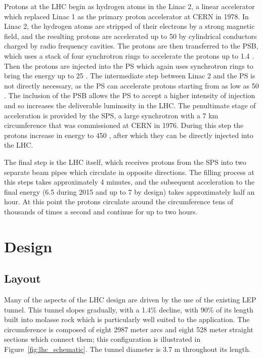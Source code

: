 Protons at the \ac{LHC} begin as hydrogen atoms in the Linac 2, a linear accelerator which replaced Linac 1 as the primary proton accelerator at CERN in 1978.
In Linac 2, the hydrogen atoms are stripped of their electrons by a strong magnetic field, and the resulting protons are accelerated up to 50 \MeV by cylindrical conductors charged by radio frequency cavities.
The protons are then transferred to the \ac{PSB}, which uses a stack of four synchrotron rings to accelerate the protons up to 1.4 \GeV.
Then the protons are injected into the \ac{PS} which again uses synchrotron rings to bring the energy up to 25 \GeV.
The intermediate step between Linac 2 and the \ac{PS} is not directly necessary, as the \ac{PS} can accelerate protons starting from as low as 50 \MeV.
The inclusion of the \ac{PSB} allows the \ac{PS} to accept a higher intensity of injection and so increases the deliverable luminosity in the \ac{LHC}.
The penultimate stage of acceleration is provided by the \ac{SPS}, a large synchrotron with a 7 km circumference that was commissioned at CERN in 1976.
During this step the protons increase in energy to 450 \GeV, after which they can be directly injected into the \ac{LHC}. 


The final step is the \ac{LHC} itself, which receives protons from the \ac{SPS} into two separate beam pipes which circulate in opposite directions.
The filling process at this steps takes approximately 4 minutes, and the subsequent acceleration to the final energy (6.5 \TeV during 2015 and up to 7 \TeV by design) takes approximately half an hour.
At this point the protons circulate around the circumference tens of thousands of times a second and continue for up to two hours.


\section{Design}

\subsection{Layout}

Many of the aspects of the \ac{LHC} design are driven by the use of the existing \ac{LEP} tunnel. 
This tunnel slopes gradually, with a 1.4\% decline, with 90\% of its length built into molasse rock which is particularly well suited to the application.
The circumference is composed of eight 2987 meter arcs and eight 528 meter straight sections which connect them; this configuration is illustrated in Figure~\ref{fig:lhc_schematic}.
The tunnel diameter is 3.7 m throughout its length. 

